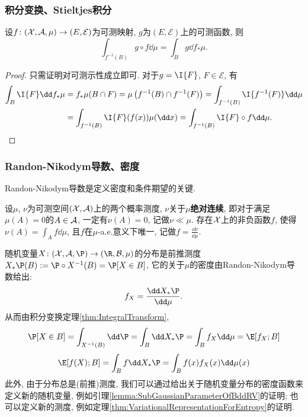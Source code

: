 \subsubsection{积分变换、Stieltjes积分}

\begin{theorem}[积分变换]\label{thm:IntegralTransform}
	设$f \colon (\mathcal{X}, \mathcal{A}, \mu) \to (E, \mathcal{E})$为可测映射, $g$为$(E, \mathcal{E})$上的可测函数, 则
	\begin{equation*}
		\int_{f^{-1}(B)} g \circ f \dd \mu 
		= \int_B g \dd f_* \mu. 
	\end{equation*}
\end{theorem}
\begin{proof}
	只需证明对可测示性成立即可. 
	对于$g = \I{F}$, $F \in \mathcal{E}$, 有
	\begin{align*}
		\int_B \I{F} \dd f_* \mu
		&= f_* \mu(B \cap F)
		= \mu \left( f^{-1}(B) \cap f^{-1}(F) \right)
		= \int_{f^{-1}(B)} \I{f^{-1}(F)} \dd \mu \\
		&= \int_{f^{-1}(B)} \I{F}(f(x)) \mu(\dd x)
		=\int_{f^{-1}(B)} \I{F} \circ f \dd \mu. 
	\end{align*}
\end{proof}




\subsubsection{Randon-Nikodym导数、密度}

Randon-Nikodym导数是定义密度和条件期望的关键. 

\begin{theorem}
	设$\mu$, $\nu$为可测空间$(\mathcal{X}, \mathcal{A})$上的两个概率测度, $\nu$关于$\mu$\textbf{绝对连续}, 即对于满足$\mu(A) = 0$的$A \in \mathcal{A}$, 一定有$\nu(A) = 0$, 记做$\nu \ll \mu$. 
	存在$\mathcal{X}$上的非负函数$f$, 使得$\nu(A) = \int_A f \dd \mu$, 且$f$在$\mu$-a.e.意义下唯一, 记做$f = \frac{\dd \nu}{\dd \mu}$. 
\end{theorem}

\begin{example}[分布的密度]
	随机变量$X \colon (\cX, \cA, \P) \to (\R, \cB, \mu)$的分布是前推测度$X_* \P (B) := \P \circ X^{-1} (B) = \P[X \in B]$, 它的关于$\mu$的密度由Randon-Nikodym导数给出: 
	\begin{equation*}
		f_X = \frac{\dd X_* \P}{\dd \mu}. 
	\end{equation*}
	从而由积分变换定理\ref{thm:IntegralTransform}, 
	\begin{equation*}
		\P[X \in B] 
		= \int_{X^{-1}(B)} \dd \P 
		= \int_B \dd X_* \P 
		= \int_B f_X \dd \mu
		= \E[f_X; B]
	\end{equation*}
	\begin{equation*}
		\E[f(X); B]
		= \int_B f \dd X_* \P 
		= \int_B f(x) f_X(x) \dd \mu(x)
	\end{equation*}
	此外, 由于分布总是(前推)测度, 我们可以通过给出关于随机变量分布的密度函数来定义新的随机变量, 例如引理\ref{lemma:SubGaussianParameterOfBddRV}的证明; 也可以定义新的测度, 例如定理\ref{thm:VariationalRepresentationForEntropy}的证明. 
\end{example}



